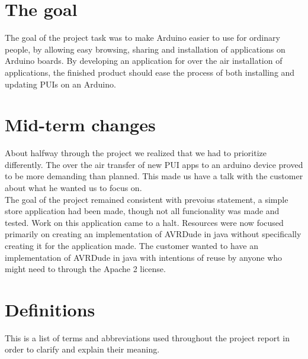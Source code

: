 \section{The goal}
The goal of the project task was to make Arduino easier to use for ordinary people, by allowing easy browsing, sharing and installation of applications on Arduino boards. By developing an application for over the air installation of applications, the finished product should ease the process of both installing and updating PUIs on an Arduino.

\section{Mid-term changes}
About halfway through the project we realized that we had to prioritize differently. The over the air transfer of new PUI apps to an arduino device proved to be more demanding than planned. This made us have a talk with the customer about what he wanted us to focus on. \\
\newline
The goal of the project remained consistent with prevoius statement, a simple store application had been made, though not all funcionality was made and tested. Work on this application came to a halt. Resources were now focused primarily on creating an implementation of AVRDude in java without specifically creating it for the application made. The customer wanted to have an implementation of AVRDude in java with intentions of reuse by anyone who might need to through the Apache 2 license. 

\section{Definitions}
This is a list of terms and abbreviations used throughout the project report in order to clarify and explain their meaning.

